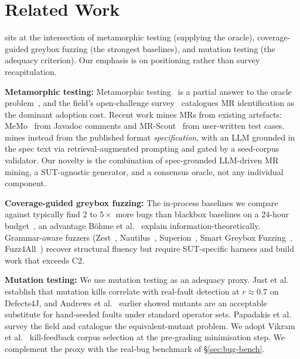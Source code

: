 \section{Related Work}
\label{sec:related}

\biotest{} sits at the intersection of metamorphic testing
(supplying the oracle), coverage-guided greybox fuzzing (the
strongest baselines), and mutation testing (the adequacy
criterion). Our emphasis is on positioning rather than survey
recapitulation.

\textbf{Metamorphic testing:}
Metamorphic testing~\cite{chen1998metamorphic} is a partial
answer to the oracle problem~\citep{barr2015oracle,myers1979art},
and the field's open-challenge
survey~\cite{chen2018metamorphic,segura2016survey} catalogues MR
identification as the dominant adoption cost. Recent work mines
MRs from existing artefacts: MeMo~\citep{blasi2021memo} from
Javadoc comments and MR-Scout~\citep{xu2024mrscout} from
user-written test cases. \biotest{} mines instead from the
published format \emph{specification}, with an LLM grounded in
the spec text via retrieval-augmented prompting and gated by a
seed-corpus validator. Our novelty is the combination of
spec-grounded LLM-driven MR mining, a SUT-agnostic generator,
and a consensus oracle, not any individual component.

\textbf{Coverage-guided greybox fuzzing:}
The in-process baselines we compare against typically find $2$ to
$5\times$ more bugs than blackbox baselines on a 24-hour
budget~\citep{klees2018fuzz}, an advantage B\"ohme et
al.~\cite{boehme2020boosting} explain information-theoretically.
Grammar-aware fuzzers (Zest~\citep{padhye2019zest},
Nautilus~\citep{aschermann2019nautilus},
Superion~\citep{wang2019superion}, Smart Greybox
Fuzzing~\citep{pham2021smartgreybox},
Fuzz4All~\citep{xia2024fuzz4all}) recover structural fluency but
require SUT-specific harness and build work that exceeds C2.

\textbf{Mutation testing:}
We use mutation testing as an adequacy proxy. Just et
al.~\cite{just2014mutants} establish that mutation kills correlate
with real-fault detection at $r{\approx}0.7$ on Defects4J, and
Andrews et al.~\cite{andrews2005mutation} earlier showed mutants
are an acceptable substitute for hand-seeded faults under
standard operator sets. Papadakis et
al.~\cite{papadakis2019mutation} survey the field and catalogue
the equivalent-mutant problem. We adopt Vikram et
al.~\cite{vikram2023guiding} kill-feedback corpus selection at
the pre-grading minimisation step. We complement the proxy with
the real-bug benchmark of \S\ref{sec:bug-bench}.

